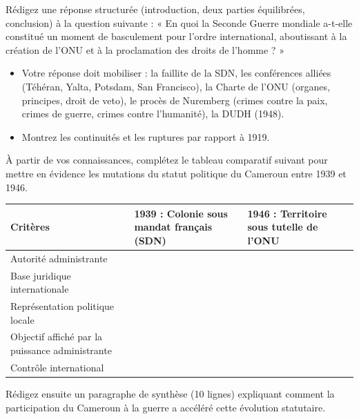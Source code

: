 \documentclass[11pt]{article}
\newcounter{popsec}
\newcounter{popsub}
\newcommand{\courssub}[1]{%
  \stepcounter{popsub}%
  \par\vspace{9pt}\noindent{\popxbold\fontsize{11.5}{13}\selectfont\color{popink}{\color{poporange}\thepopsec.\thepopsub}\hspace{6pt}#1}\par\nopagebreak\vspace{4pt}
}
\begin{document}
\begin{exercice}
Rédigez une réponse structurée (introduction, deux parties équilibrées, conclusion) à la question suivante :
« En quoi la Seconde Guerre mondiale a-t-elle constitué un moment de basculement pour l'ordre international, aboutissant à la création de l'ONU et à la proclamation des droits de l'homme ? »
\begin{itemize}
\item Votre réponse doit mobiliser : la faillite de la SDN, les conférences alliées (Téhéran, Yalta, Potsdam, San Francisco), la Charte de l'ONU (organes, principes, droit de veto), le procès de Nuremberg (crimes contre la paix, crimes de guerre, crimes contre l'humanité), la DUDH (1948).
\item Montrez les continuités et les ruptures par rapport à 1919.
\end{itemize}
\end{exercice}

\begin{exercice}
À partir de vos connaissances, complétez le tableau comparatif suivant pour mettre en évidence les mutations du statut politique du Cameroun entre 1939 et 1946.

\begin{center}
\begin{tabularx}{\linewidth}{|l|X|X|}\hline
\textbf{Critères} & \textbf{1939 : Colonie sous mandat français (SDN)} & \textbf{1946 : Territoire sous tutelle de l'ONU} \\ \hline
Autorité administrante & & \\ \hline
Base juridique internationale & & \\ \hline
Représentation politique locale & & \\ \hline
Objectif affiché par la puissance administrante & & \\ \hline
Contrôle international & & \\ \hline
\end{tabularx}
\end{center}
Rédigez ensuite un paragraphe de synthèse (10 lignes) expliquant comment la participation du Cameroun à la guerre a accéléré cette évolution statutaire.
\end{exercice}

\courssub{Je me prépare au Bac}
\end{document}
